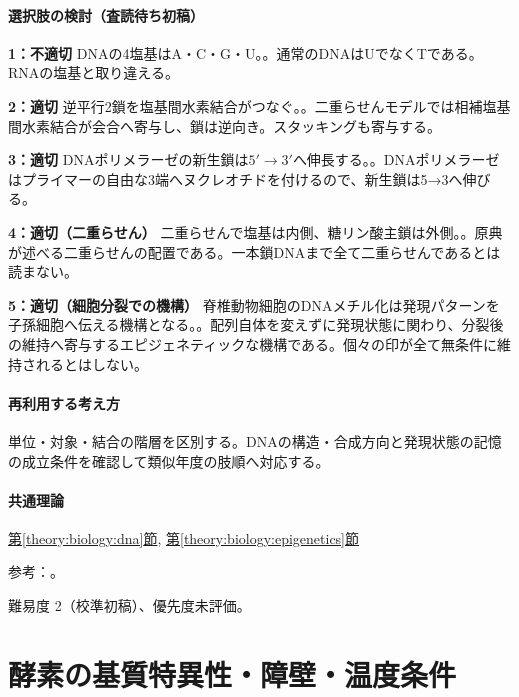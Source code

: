 \paragraph{選択肢の検討（査読待ち初稿）}\mbox{}\par

\noindent\textbf{1：不適切} DNAの4塩基はA・C・G・U。。通常のDNAはUでなくTである。RNAの塩基と取り違える。\par

\noindent\textbf{2：適切} 逆平行2鎖を塩基間水素結合がつなぐ。。二重らせんモデルでは相補塩基間水素結合が会合へ寄与し、鎖は逆向き。スタッキングも寄与する。\par

\noindent\textbf{3：適切} DNAポリメラーゼの新生鎖は\(5'\to3'\)へ伸長する。。DNAポリメラーゼはプライマーの自由な3端へヌクレオチドを付けるので、新生鎖は5→3へ伸びる。\par

\noindent\textbf{4：適切（二重らせん）} 二重らせんで塩基は内側、糖リン酸主鎖は外側。。原典が述べる二重らせんの配置である。一本鎖DNAまで全て二重らせんであるとは読まない。\par

\noindent\textbf{5：適切（細胞分裂での機構）} 脊椎動物細胞のDNAメチル化は発現パターンを子孫細胞へ伝える機構となる。。配列自体を変えずに発現状態に関わり、分裂後の維持へ寄与するエピジェネティックな機構である。個々の印が全て無条件に維持されるとはしない。\par

\paragraph{再利用する考え方} 単位・対象・結合の階層を区別する。DNAの構造・合成方向と発現状態の記憶の成立条件を確認して類似年度の肢順へ対応する。

\paragraph{共通理論} \hyperref[theory:biology:dna]{第\ref*{theory:biology:dna}節}, \hyperref[theory:biology:epigenetics]{第\ref*{theory:biology:epigenetics}節}

\par 参考：\cite{nhgri_dna,nhgri_epigenomics}。

\par 難易度 2（校準初稿）、優先度未評価。

\section{酵素の基質特異性・障壁・温度条件}

